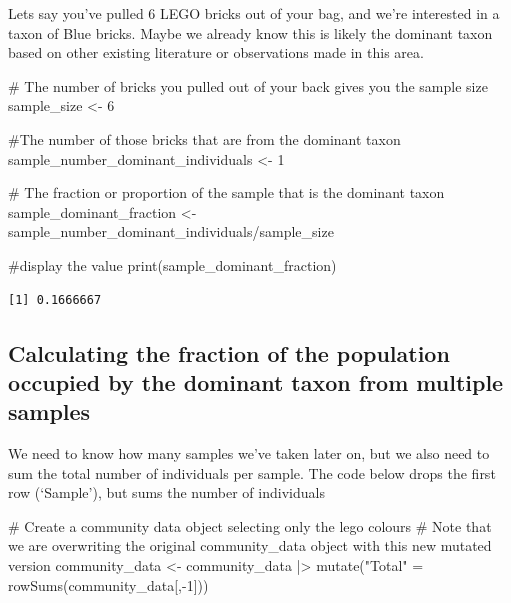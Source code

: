 \documentclass[
  letterpaper,
  DIV=11,
  numbers=noendperiod]{scrreprt}
\newenvironment{Shaded}{\begin{snugshade}}{\end{snugshade}}
\newcommand{\CommentTok}[1]{\textcolor[rgb]{0.37,0.37,0.37}{#1}}
\newcommand{\DecValTok}[1]{\textcolor[rgb]{0.68,0.00,0.00}{#1}}
\newcommand{\FunctionTok}[1]{\textcolor[rgb]{0.28,0.35,0.67}{#1}}
\newcommand{\NormalTok}[1]{\textcolor[rgb]{0.00,0.23,0.31}{#1}}
\newcommand{\OtherTok}[1]{\textcolor[rgb]{0.00,0.23,0.31}{#1}}
\newcommand{\SpecialCharTok}[1]{\textcolor[rgb]{0.37,0.37,0.37}{#1}}
\newcommand{\StringTok}[1]{\textcolor[rgb]{0.13,0.47,0.30}{#1}}
\begin{document}
Lets say you've pulled 6 LEGO bricks out of your bag, and we're
interested in a taxon of Blue bricks. Maybe we already know this is
likely the dominant taxon based on other existing literature or
observations made in this area.

\begin{Shaded}
\begin{Highlighting}[]
\CommentTok{\# The number of bricks you pulled out of your back gives you the sample size}
\NormalTok{sample\_size }\OtherTok{\textless{}{-}} \DecValTok{6} 

\CommentTok{\#The number of those bricks that are from the dominant taxon}
\NormalTok{sample\_number\_dominant\_individuals }\OtherTok{\textless{}{-}} \DecValTok{1} 

\CommentTok{\# The fraction or proportion of the sample that is the dominant taxon}
\NormalTok{sample\_dominant\_fraction }\OtherTok{\textless{}{-}}\NormalTok{ sample\_number\_dominant\_individuals}\SpecialCharTok{/}\NormalTok{sample\_size}

\CommentTok{\#display the value }
\FunctionTok{print}\NormalTok{(sample\_dominant\_fraction)}
\end{Highlighting}
\end{Shaded}

\begin{verbatim}
[1] 0.1666667
\end{verbatim}

\subsection{Calculating the fraction of the population occupied by the
dominant taxon from multiple
samples}\label{calculating-the-fraction-of-the-population-occupied-by-the-dominant-taxon-from-multiple-samples}

We need to know how many samples we've taken later on, but we also need
to sum the total number of individuals per sample. The code below drops
the first row (`Sample'), but sums the number of individuals

\begin{Shaded}
\begin{Highlighting}[]
\CommentTok{\# Create a community data object selecting only the lego colours}
\CommentTok{\# Note that we are overwriting the original community\_data object with this new mutated version}
\NormalTok{community\_data }\OtherTok{\textless{}{-}}\NormalTok{ community\_data }\SpecialCharTok{|\textgreater{}}
  \FunctionTok{mutate}\NormalTok{(}\StringTok{"Total"} \OtherTok{=} \FunctionTok{rowSums}\NormalTok{(community\_data[,}\SpecialCharTok{{-}}\DecValTok{1}\NormalTok{]))}
\end{Highlighting}
\end{Shaded}
\end{document}
